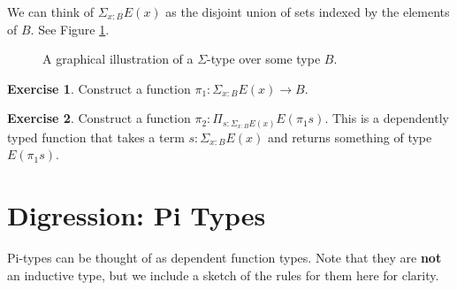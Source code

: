 \documentclass{amsart}
\theoremstyle{definition}
\newtheorem{ex}{Exercise}[section]
\begin{document}
We can think of $\Sigma_{x : B}E(x)$ as the disjoint union of sets indexed by the elements of $B$.
See Figure \ref{fig:sigma-type-as-total-space}.
\begin{figure}[h]
    \centering
    
    \caption{A graphical illustration of a $\Sigma$-type over some type $B$.}
    \label{fig:sigma-type-as-total-space}
\end{figure}

\begin{ex}
Construct a function $\pi_1 : \Sigma_{x : B} E(x) \to B$.
\end{ex}

\begin{ex}
Construct a function $\pi_2 : \Pi_{s : \Sigma_{x : B} E(x)} E(\pi_1 s)$. This is a dependently typed function that takes a term $s : \Sigma_{x : B} E(x)$ and returns something of type $E(\pi_1 s)$.
\end{ex}

\section{Digression: Pi Types}
Pi-types can be thought of as dependent function types. Note that they are \textbf{not} an inductive type, but we include a sketch of the rules for them here for clarity.
\end{document}
